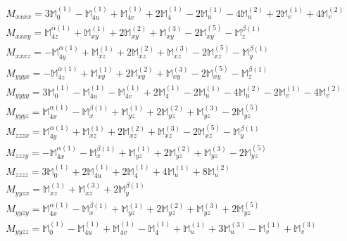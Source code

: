\documentclass[fleqn,8pt,landscape]{jsarticle}
\begin{document}
\begin{align*}
& M_{xxxx} = 3 \mathbb{M}_{0}^{(1)} - \mathbb{M}_{4u}^{(1)} + \mathbb{M}_{4v}^{(1)} + 2 \mathbb{M}_{4}^{(1)} - 2 \mathbb{M}_{u}^{(1)} - 4 \mathbb{M}_{u}^{(2)} + 2 \mathbb{M}_{v}^{(1)} + 4 \mathbb{M}_{v}^{(2)} \\
& M_{xxxy} = \mathbb{M}_{4z}^{\alpha(1)} + \mathbb{M}_{xy}^{(1)} + 2 \mathbb{M}_{xy}^{(2)} + \mathbb{M}_{xy}^{(3)} - 2 \mathbb{M}_{xy}^{(5)} - \mathbb{M}_{z}^{\beta(1)} \\
& M_{xxxz} = - \mathbb{M}_{4y}^{\alpha(1)} + \mathbb{M}_{xz}^{(1)} + 2 \mathbb{M}_{xz}^{(2)} + \mathbb{M}_{xz}^{(3)} - 2 \mathbb{M}_{xz}^{(5)} - \mathbb{M}_{y}^{\beta(1)} \\
& M_{yyyx} = - \mathbb{M}_{4z}^{\alpha(1)} + \mathbb{M}_{xy}^{(1)} + 2 \mathbb{M}_{xy}^{(2)} + \mathbb{M}_{xy}^{(3)} - 2 \mathbb{M}_{xy}^{(5)} - \mathbb{M}_{z}^{\beta(1)} \\
& M_{yyyy} = 3 \mathbb{M}_{0}^{(1)} - \mathbb{M}_{4u}^{(1)} - \mathbb{M}_{4v}^{(1)} + 2 \mathbb{M}_{4}^{(1)} - 2 \mathbb{M}_{u}^{(1)} - 4 \mathbb{M}_{u}^{(2)} - 2 \mathbb{M}_{v}^{(1)} - 4 \mathbb{M}_{v}^{(2)} \\
& M_{yyyz} = \mathbb{M}_{4x}^{\alpha(1)} - \mathbb{M}_{x}^{\beta(1)} + \mathbb{M}_{yz}^{(1)} + 2 \mathbb{M}_{yz}^{(2)} + \mathbb{M}_{yz}^{(3)} - 2 \mathbb{M}_{yz}^{(5)} \\
& M_{zzzx} = \mathbb{M}_{4y}^{\alpha(1)} + \mathbb{M}_{xz}^{(1)} + 2 \mathbb{M}_{xz}^{(2)} + \mathbb{M}_{xz}^{(3)} - 2 \mathbb{M}_{xz}^{(5)} - \mathbb{M}_{y}^{\beta(1)} \\
& M_{zzzy} = - \mathbb{M}_{4x}^{\alpha(1)} - \mathbb{M}_{x}^{\beta(1)} + \mathbb{M}_{yz}^{(1)} + 2 \mathbb{M}_{yz}^{(2)} + \mathbb{M}_{yz}^{(3)} - 2 \mathbb{M}_{yz}^{(5)} \\
& M_{zzzz} = 3 \mathbb{M}_{0}^{(1)} + 2 \mathbb{M}_{4u}^{(1)} + 2 \mathbb{M}_{4}^{(1)} + 4 \mathbb{M}_{u}^{(1)} + 8 \mathbb{M}_{u}^{(2)} \\
& M_{yyzx} = \mathbb{M}_{xz}^{(1)} + \mathbb{M}_{xz}^{(3)} + 2 \mathbb{M}_{y}^{\beta(1)} \\
& M_{yyzy} = \mathbb{M}_{4x}^{\alpha(1)} - \mathbb{M}_{x}^{\beta(1)} + \mathbb{M}_{yz}^{(1)} + 2 \mathbb{M}_{yz}^{(2)} + \mathbb{M}_{yz}^{(3)} + 2 \mathbb{M}_{yz}^{(5)} \\
& M_{yyzz} = \mathbb{M}_{0}^{(1)} - \mathbb{M}_{4u}^{(1)} + \mathbb{M}_{4v}^{(1)} - \mathbb{M}_{4}^{(1)} + \mathbb{M}_{u}^{(1)} + 3 \mathbb{M}_{u}^{(3)} - \mathbb{M}_{v}^{(1)} + \mathbb{M}_{v}^{(3)} \\

\end{align*}
\end{document}
